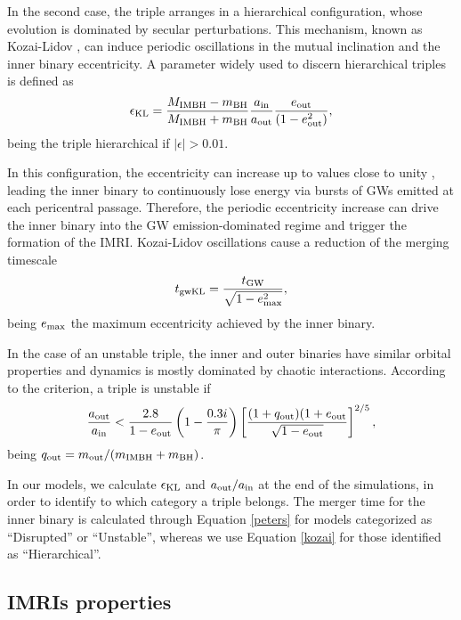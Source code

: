 \documentclass[twocolumn]{aastex62}
\newcommand{\gw}{{\rm GW}}
\newcommand{\kl}{{\rm KL}}
\newcommand{\imbh}{{\rm IMBH}}
\newcommand{\inn}{{\rm in}}
\newcommand{\out}{{\rm out}}
\newcommand{\bh}{{\rm BH}}
\begin{document}
In the second case, the triple arranges in a hierarchical configuration, whose evolution is dominated by secular perturbations. This mechanism, known as Kozai-Lidov \citep{kozai62,lidov62}, can induce periodic oscillations in the mutual inclination and the inner binary eccentricity. A parameter widely used to discern hierarchical triples is defined as \citep{Lithwick11,naoz11}
\begin{equation}
\epsilon_\kl = \frac{M_\imbh - m_\bh }{M_\imbh + m_\bh} \frac{a_{\inn}}{a_{\out}}\frac{e_{\out}}{(1-e_{\out}^2)},
\end{equation}
being the triple hierarchical if $|\epsilon| > 0.01$.

In this configuration, the eccentricity can increase up to values close to unity \citep{naoz11,naoz16}, leading the inner binary to continuously lose energy via bursts of GWs emitted at each pericentral passage. Therefore, the periodic eccentricity increase can drive the inner binary into the GW emission-dominated regime and trigger the formation of the IMRI. Kozai-Lidov oscillations cause a reduction of the merging timescale \citep[see for instance]{antonini12}
\begin{equation}
    t_{\rm gwKL} = \frac{t_\gw}{\sqrt{1-e_{\rm max}^2}},
\label{kozai}
\end{equation}
being $e_{\rm max}$ the maximum eccentricity achieved by the inner binary. 

In the case of an unstable triple, the inner and outer binaries have similar orbital properties and dynamics is mostly dominated by chaotic interactions. According to the \cite{mardling01} criterion, a triple is unstable if
\begin{equation}
    \frac{a_\out}{a_\inn} < \frac{2.8}{1-e_\out}\left(1-\frac{0.3i}{\pi}\right)\left[\frac{(1+q_\out)(1+e_\out}{\sqrt{1-e_\out}}\right]^{2/5}, 
\end{equation}
being $q_\out = m_\out/(m_\imbh + m_\bh)$.

In our models, we calculate $\epsilon_\kl$ and $a_\out/a_\inn$ at the end of the simulations, in order to identify to which category a triple belongs. The merger time for the inner binary is calculated through Equation \ref{peters} for models categorized as ``Disrupted'' or ``Unstable'', whereas we use Equation \ref{kozai} for those identified as ``Hierarchical''. 

\subsection{IMRIs properties}
\end{document}
